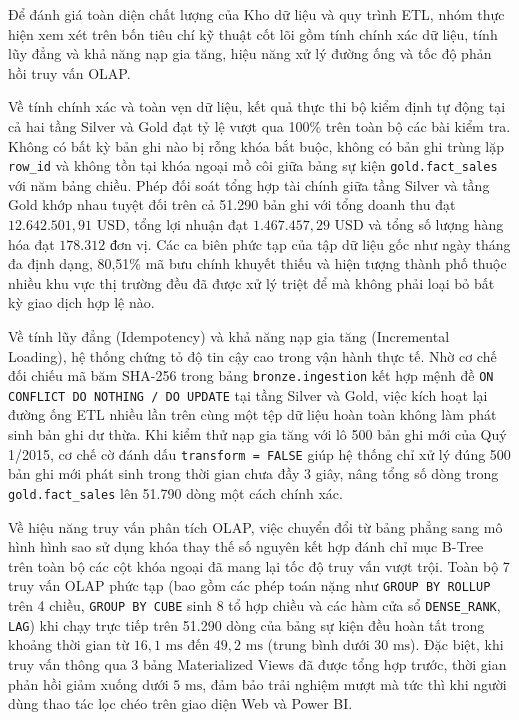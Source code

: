 Để đánh giá toàn diện chất lượng của Kho dữ liệu và quy trình ETL, nhóm thực hiện xem xét trên bốn tiêu chí kỹ thuật cốt lõi gồm tính chính xác dữ liệu, tính lũy đẳng và khả năng nạp gia tăng, hiệu năng xử lý đường ống và tốc độ phản hồi truy vấn OLAP.

Về tính chính xác và toàn vẹn dữ liệu, kết quả thực thi bộ kiểm định tự động tại cả hai tầng Silver và Gold đạt tỷ lệ vượt qua 100\% trên toàn bộ các bài kiểm tra. Không có bất kỳ bản ghi nào bị rỗng khóa bắt buộc, không có bản ghi trùng lặp \texttt{row\_id} và không tồn tại khóa ngoại mồ côi giữa bảng sự kiện \texttt{gold.fact\_sales} với năm bảng chiều. Phép đối soát tổng hợp tài chính giữa tầng Silver và tầng Gold khớp nhau tuyệt đối trên cả 51.290 bản ghi với tổng doanh thu đạt $12.642.501,91\text{ USD}$, tổng lợi nhuận đạt $1.467.457,29\text{ USD}$ và tổng số lượng hàng hóa đạt $178.312\text{ đơn vị}$. Các ca biên phức tạp của tập dữ liệu gốc như ngày tháng đa định dạng, 80,51\% mã bưu chính khuyết thiếu và hiện tượng thành phố thuộc nhiều khu vực thị trường đều đã được xử lý triệt để mà không phải loại bỏ bất kỳ giao dịch hợp lệ nào.

Về tính lũy đẳng (Idempotency) và khả năng nạp gia tăng (Incremental Loading), hệ thống chứng tỏ độ tin cậy cao trong vận hành thực tế. Nhờ cơ chế đối chiếu mã băm SHA-256 trong bảng \texttt{bronze.ingestion} kết hợp mệnh đề \texttt{ON CONFLICT DO NOTHING / DO UPDATE} tại tầng Silver và Gold, việc kích hoạt lại đường ống ETL nhiều lần trên cùng một tệp dữ liệu hoàn toàn không làm phát sinh bản ghi dư thừa. Khi kiểm thử nạp gia tăng với lô 500 bản ghi mới của Quý 1/2015, cơ chế cờ đánh dấu \texttt{transform = FALSE} giúp hệ thống chỉ xử lý đúng 500 bản ghi mới phát sinh trong thời gian chưa đầy 3 giây, nâng tổng số dòng trong \texttt{gold.fact\_sales} lên 51.790 dòng một cách chính xác.

Về hiệu năng truy vấn phân tích OLAP, việc chuyển đổi từ bảng phẳng sang mô hình hình sao sử dụng khóa thay thế số nguyên kết hợp đánh chỉ mục B-Tree trên toàn bộ các cột khóa ngoại đã mang lại tốc độ truy vấn vượt trội. Toàn bộ 7 truy vấn OLAP phức tạp (bao gồm các phép toán nặng như \texttt{GROUP BY ROLLUP} trên 4 chiều, \texttt{GROUP BY CUBE} sinh 8 tổ hợp chiều và các hàm cửa sổ \texttt{DENSE\_RANK}, \texttt{LAG}) khi chạy trực tiếp trên 51.290 dòng của bảng sự kiện đều hoàn tất trong khoảng thời gian từ $16,1\text{ ms}$ đến $49,2\text{ ms}$ (trung bình dưới $30\text{ ms}$). Đặc biệt, khi truy vấn thông qua 3 bảng Materialized Views đã được tổng hợp trước, thời gian phản hồi giảm xuống dưới $5\text{ ms}$, đảm bảo trải nghiệm mượt mà tức thì khi người dùng thao tác lọc chéo trên giao diện Web và Power BI.

